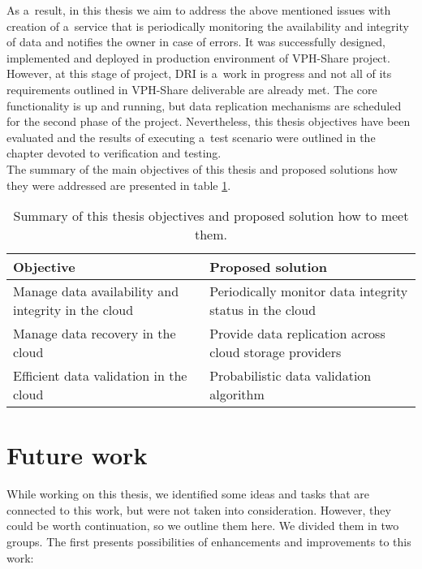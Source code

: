 As a~result, in this thesis we aim to address the above mentioned issues with
creation of a~service that is periodically monitoring the availability and integrity
of data and notifies the owner in case of errors. It was successfully designed,
implemented and deployed in production environment of VPH-Share project. However,
at this stage of project, DRI is a~work in progress and not all of its requirements
outlined in VPH-Share deliverable are already met. The core functionality is up and
running, but data replication mechanisms are scheduled for the second phase of the
project. Nevertheless, this thesis objectives have been evaluated and the results
of executing a~test scenario were outlined in the chapter devoted to verification
and testing.\\

The summary of the main objectives of this thesis and proposed solutions how they were
addressed are presented in table \ref{tab:objectives-solutions}.

\begin{table}[h!]
\centering
\begin{tabular}{|l|l|}
	\hline
	Objective & Proposed solution \\ \hline \hline
	Manage data availability and integrity in the cloud & Periodically monitor data integrity status in the cloud \\ \hline
	Manage data recovery in the cloud & Provide data replication across cloud storage providers \\ \hline
	Efficient data validation in the cloud & Probabilistic data validation algorithm\\ \hline
\end{tabular}
\caption{Summary of this thesis objectives and proposed solution how to meet them.}
\label{tab:objectives-solutions}
\end{table}



\section{Future work}
While working on this thesis, we identified some ideas and tasks that are connected
to this work, but were not taken into consideration. However, they could be worth
continuation, so we outline them here. We divided them in two groups. The first presents
possibilities of enhancements and improvements to this work:

